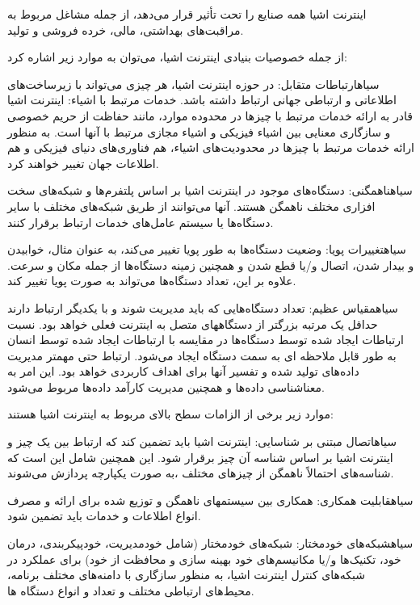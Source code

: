 اینترنت اشیا همه صنایع را تحت تأثیر قرار می‌دهد، از جمله مشاغل مربوط به مراقبت‌های بهداشتی، مالی، خرده فروشی و تولید.

از جمله خصوصیات بنیادی اینترنت اشیا، می‌توان به موارد زیر اشاره کرد:

 ‌سیاه{ارتباطات متقابل}:
در حوزه اینترنت اشیا، هر چیزی می‌تواند با زیرساخت‌های اطلاعاتی و ارتباطی جهانی ارتباط داشته باشد.
خدمات مرتبط با اشیاء: اینترنت اشیا قادر به ارائه خدمات مرتبط با چیزها در محدوده موارد، مانند حفاظت از حریم خصوصی و سازگاری معنایی بین اشیاء فیزیکی و اشیاء مجازی مرتبط با آنها است. به منظور ارائه خدمات مرتبط با چیزها در محدودیت‌های اشیاء، هم فناوری‌های دنیای فیزیکی و هم اطلاعات جهان تغییر خواهند کرد.

 ‌سیاه{ناهمگنی}:
دستگاه‌های موجود در اینترنت اشیا بر اساس پلتفرم‌ها و شبکه‌های سخت افزاری مختلف ناهمگن هستند. آنها می‌توانند از طریق شبکه‌های مختلف با سایر دستگاه‌ها یا سیستم عامل‌های خدمات ارتباط برقرار کنند.

 ‌سیاه{تغییرات پویا}:
 وضعیت دستگاه‌ها به طور پویا تغییر می‌کند، به عنوان مثال، خوابیدن و بیدار شدن، اتصال و/یا قطع شدن و همچنین زمینه دستگاه‌ها از جمله مکان و سرعت. علاوه بر این، تعداد دستگاه‌ها می‌تواند به صورت پویا تغییر کند.

 ‌سیاه{مقیاس عظیم}:
تعداد دستگاه‌هایی که باید مدیریت شوند و با یکدیگر ارتباط دارند حداقل یک مرتبه بزرگتر از دستگاههای متصل به اینترنت فعلی خواهد بود. نسبت ارتباطات ایجاد شده توسط دستگاه‌ها در مقایسه با ارتباطات ایجاد شده توسط انسان به طور قابل ملاحظه ای به سمت دستگاه ایجاد می‌شود.
ارتباط حتی مهمتر مدیریت داده‌های تولید شده و تفسیر آنها برای اهداف کاربردی خواهد بود. این امر به معناشناسی داده‌ها و همچنین مدیریت کارآمد داده‌ها مربوط می‌شود.



موارد زیر برخی از الزامات سطح بالای مربوط به اینترنت اشیا هستند:


 ‌سیاه{اتصال مبتنی بر شناسایی}:
اینترنت اشیا باید تضمین کند که ارتباط بین یک چیز و اینترنت اشیا بر اساس شناسه آن چیز برقرار شود. این همچنین شامل این است که شناسه‌های احتمالاً ناهمگن از چیزهای مختلف ،به صورت یکپارچه پردازش می‌شوند.

 ‌سیاه{قابلیت همکاری}:
همکاری بین سیستمهای ناهمگن و توزیع شده برای ارائه و مصرف انواع اطلاعات و خدمات باید تضمین شود.

 ‌سیاه{شبکه‌های خودمختار}:
شبکه‌های خودمختار (شامل خودمدیریت، خودپیکربندی، درمان خود، تکنیک‌ها و/یا مکانیسم‌های خود بهینه سازی و محافظت از خود) برای عملکرد در شبکه‌های کنترل اینترنت اشیا، به منظور سازگاری با دامنه‌های مختلف برنامه، محیط‌های ارتباطی مختلف و تعداد و انواع دستگاه ها.

